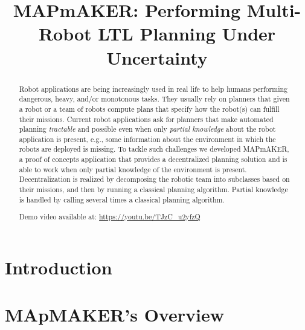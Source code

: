 \documentclass[10pt,conference]{IEEEtran}
\newcommand{\toolName}{MAPmAKER}
\begin{document}
	
	
	\title{MAPmAKER: Performing Multi-Robot LTL Planning Under Uncertainty}

	
	\author{
	}	
	
	\maketitle

	\begin{abstract}
		Robot applications are being increasingly used in real life to help humans performing dangerous, heavy, and/or monotonous tasks.
		They usually rely on planners that given a robot or a team of robots compute plans that specify how the robot(s) can fulfill their missions.
		Current robot applications ask for planners that make automated planning \emph{tractable}  and possible even when only \emph{partial knowledge} about the robot application is present, e.g., some information about the environment in which the robots are deployed is missing.
		To tackle such challenges we developed \toolName, a proof of concepts application  that provides a decentralized planning solution  and  is able to work when only partial knowledge of the environment is present.
		Decentralization is realized by decomposing the robotic team into subclasses based on their missions, and then by running a classical planning algorithm.
		Partial knowledge is handled by calling several times  a classical planning algorithm.
		
		Demo video available at: \url{https://youtu.be/TJzC_u2yfzQ}
	\end{abstract}
	
	\section{Introduction}
	
	
	\section{MApMAKER's Overview}
	\label{sec:approach}
	
	
\end{document}
